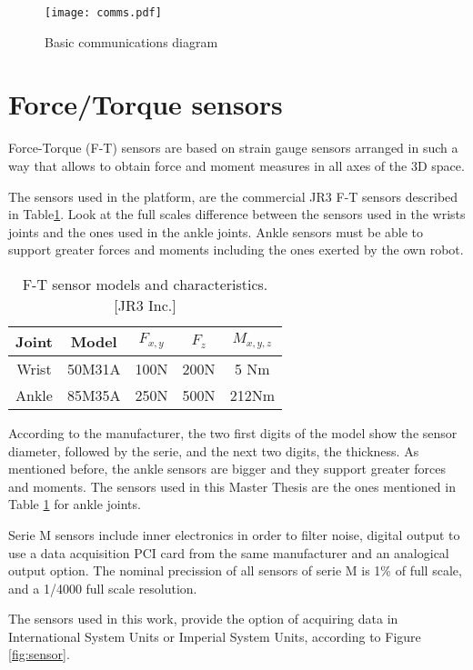 \begin{figure}[!hbt]
\centering
\texttt{[image: comms.pdf]}
\label{fig:comms}
\caption{Basic communications diagram}
\end{figure}

\section{Force/Torque sensors}
Force-Torque (F-T) sensors are based on strain gauge sensors arranged in such a way that allows to obtain force and moment measures in all axes of the 3D space. 

The sensors used in the platform, are the commercial JR3 F-T sensors described in Table\ref{table:sensores}. Look at the full scales difference between the sensors used in the wrists joints and the ones used in the ankle joints. Ankle sensors must be able to support greater forces and moments including the ones exerted by the own robot.

\begin{table}[!hbt]
\centering
\begin{tabular}{|c|c|c|c|c|}
\hline
Joint & Model & $F_{x,y}$ & $F_z$ & $M_{x,y,z}$\\
\hline
Wrist & 50M31A & 100N & 200N & 5 Nm\\ 
\hline
Ankle & 85M35A & 250N & 500N & 212Nm\\
\hline
\end{tabular}
\caption{F-T sensor models and characteristics. [JR3 Inc.]}
\label{table:sensores}
\end{table}

According to the manufacturer, the two first digits of the model show the sensor diameter, followed by the serie, and the next two digits, the thickness. As mentioned before, the ankle sensors are bigger and they support greater forces and moments. The sensors used in this Master Thesis are the ones mentioned in Table \ref{table:sensores} for ankle joints.

Serie M sensors include inner electronics in order to filter noise, digital output to use a data acquisition PCI card from the same manufacturer and an analogical output option. The nominal precission of all sensors of serie M is 1\% of full scale, and a 1/4000 full scale resolution.

The sensors used in this work, provide the option of acquiring data in International System Units or Imperial System Units, according to Figure \ref{fig:sensor}.

